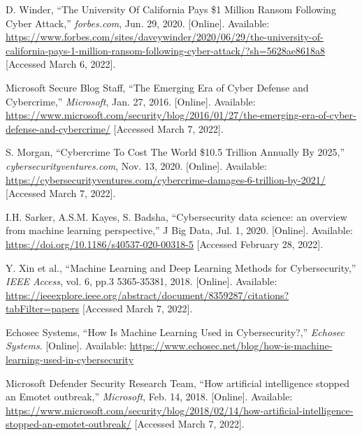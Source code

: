 \begin{thebibliography}{99}
    D. Winder, ``The University Of California Pays \$1 Million Ransom Following Cyber Attack,''
    \textit{forbes.com}, Jun. 29, 2020. [Online].
    Available: \href{https://www.forbes.com/sites/daveywinder/2020/06/29/the-university-of-california-pays-1-million-ransom-following-cyber-attack/?sh=5628ae8618a8}{https://www.forbes.com/sites/daveywinder/2020/06/29/the-university-of-california-pays-1-million-ransom-following-cyber-attack/?sh=5628ae8618a8}
    [Accessed March 6, 2022].

    Microsoft Secure Blog Staff, ``The Emerging Era of Cyber Defense and Cybercrime,''
    \textit{Microsoft}, Jan. 27, 2016. [Online].
    Available: \href{https://www.microsoft.com/security/blog/2016/01/27/the-emerging-era-of-cyber-defense-and-cybercrime/}{https://www.microsoft.com/security/blog/2016/01/27/the-emerging-era-of-cyber-defense-and-cybercrime/}
    [Accessed March 7, 2022].

    S. Morgan, ``Cybercrime To Cost The World \$10.5 Trillion Annually By 2025,''
    \textit{cybersecurityventures.com}, Nov. 13, 2020. [Online].
    Available: \href{https://cybersecurityventures.com/cybercrime-damages-6-trillion-by-2021/}{https://cybersecurityventures.com/cybercrime-damages-6-trillion-by-2021/}
    [Accessed March 7, 2022].

    I.H. Sarker, A.S.M. Kayes, S. Badsha, ``Cybersecurity data science: an overview from machine learning perspective,''
    J Big Data, Jul. 1, 2020. [Online].
    Available: \href{https://doi.org/10.1186/s40537-020-00318-5}{https://doi.org/10.1186/s40537-020-00318-5}
    [Accessed February 28, 2022].

    Y. Xin et al., ``Machine Learning and Deep Learning Methods for Cybersecurity,''
    \textit{IEEE Access}, vol. 6, pp.3 5365-35381, 2018. [Online].
    Available: \href{https://ieeexplore.ieee.org/abstract/document/8359287/citations?tabFilter=papers}{https://ieeexplore.ieee.org/abstract/document/8359287/citations?tabFilter=papers}
    [Accessed March 7, 2022].

    Echosec Systems, ``How Is Machine Learning Used in Cybersecurity?,''
    \textit{Echosec Systems}. [Online].
    Available: \href{https://www.echosec.net/blog/how-is-machine-learning-used-in-cybersecurity}{https://www.echosec.net/blog/how-is-machine-learning-used-in-cybersecurity}

    Microsoft Defender Security Research Team, ``How artificial intelligence stopped an Emotet outbreak,''
    \textit{Microsoft}, Feb. 14, 2018. [Online].
    Available: \href{https://www.microsoft.com/security/blog/2018/02/14/how-artificial-intelligence-stopped-an-emotet-outbreak/}{https://www.microsoft.com/security/blog/2018/02/14/how-artificial-intelligence-stopped-an-emotet-outbreak/}
    [Accessed March 7, 2022].
\end{thebibliography}
